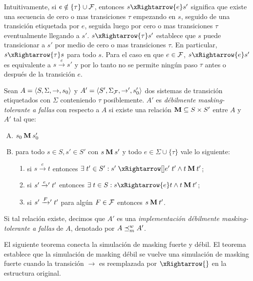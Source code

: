 Intuitivamente, si $e \notin \{\tau\}\cup\mathcal{F}$, entonces $s\xRightarrow{e}s'$ significa que existe una secuencia de cero o mas transiciones $\tau$ empezando en $s$, seguido de una transición etiquetada por $e$, seguida luego por cero o mas transiciones $\tau$ eventualmente llegando a  $s'$.
$s \xRightarrow{\tau} s'$ establece que $s$ puede transicionar a $s'$ por medio de cero o mas transiciones $\tau$.
%
En particular, $s \xRightarrow{\tau} s$ para todo $s$.
%
Para el caso en que $e\in\mathcal{F}$,
$s\xRightarrow{e}s'$ es equivalente a $s\xrightarrow{e}s'$ y por lo tanto
no se permite ningún paso $\tau$ antes o después de la transición $e$.


\begin{defi} \label{def:weak_mask}
  Sean $A =\langle S, \Sigma, \rightarrow, s_0 \rangle$ y $A' =\langle S',
  \Sigma_{\mathcal{F}}, \rightarrow', s'_0 \rangle$ dos sistemas de transición etiquetados con $\Sigma$
  conteniendo $\tau$ posiblemente.  $A'$ es \emph{débilmente masking-tolerante a fallas}
  con respecto a $A$ si existe una relación $\mathbin{\mathbf{M}} \subseteq S
  \times S'$ entre $A$ y $A'$ tal que:

\begin{enumerate}[(A)]
  \item $s_0 \mathbin{\mathbf{M}} s'_0$
  \item para todo $s \in S, s' \in S'$ con $s \mathbin{\mathbf{M}} s'$ y todo $e \in \Sigma \cup \{\tau\}$ vale lo siguiente:

  \begin{enumerate}[(1)]
    \item si $s \xrightarrow{e} t$ entonces 
    $\exists\; t' \in S': s' \xRightarrowprime{e} t' 
    \wedge t \M t'$;

      \item si $s' \mathrel{{\xrightarrow[]{e}}{}'} t'$ entonces  
      $\exists \; t \in S: s \xRightarrow{e} t  
      \wedge t \M t'$;

      \item si $s' \mathrel{{\xrightarrow[]{F}}{}'} t'$ para algún $F \in \mathcal{F}$ entonces 
      $s \mathbin{\mathbf{M}} t'$.
  \end{enumerate}
\end{enumerate}

%
Si tal relación existe, decimos que $A'$ es una \emph{implementación débilmente masking-tolerante a fallas} de
$A$, denotado por $A \preceq^w_{m} A'$.
\end{defi}

El siguiente teorema conecta la simulación de masking fuerte y débil. El teorema establece que la simulación de masking débil se vuelve una simulación de masking fuerte cuando la transición $\xrightarrow{}$ es reemplazada por $\xRightarrow{}$ en la estructura original.

